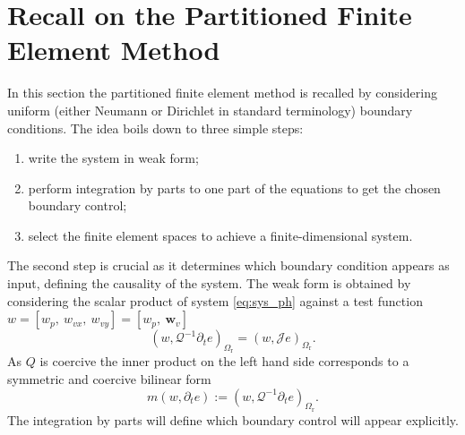 \documentclass{ifacconf}
\begin{document}
\section{Recall on the Partitioned Finite Element Method}
\label{sec:PFEM}
In this section the partitioned finite element method \cite{cardoso2019partitioned} is recalled by considering uniform (either Neumann or Dirichlet in standard terminology) boundary conditions. The idea boils down to three simple steps:
\begin{enumerate}
	\item write the system in weak form;
	\item perform integration by parts to one part of the equations to get the chosen boundary control;
	\item select the finite element spaces to achieve a finite-dimensional system.
\end{enumerate}
The second step is crucial as it determines which boundary condition appears as input, defining the causality of the system.  The weak form is obtained by considering the scalar product of system \eqref{eq:sys_ph} against a test function $w=[w_p, \ w_{vx}, \ w_{vy}]=[w_p, \ \bm{w}_{v}]$ 
\begin{equation}
\label{eq:weak_form}
    \left(w, \mathcal{Q}^{-1} \partial_t{e} \right)_{\Omega_{\text{r}}} = \left(w, \mathcal{J} e \right)_{\Omega_{\text{r}}}.
\end{equation}
As $Q$ is coercive the inner product on the left hand side corresponds to a symmetric and coercive bilinear form 
\[m(w, \partial_t{e}) := \left(w, \mathcal{Q}^{-1} \partial_t{e} \right)_{\Omega_{\text{r}}}.
\]
The integration by parts will define which boundary control will appear explicitly.
\end{document}
